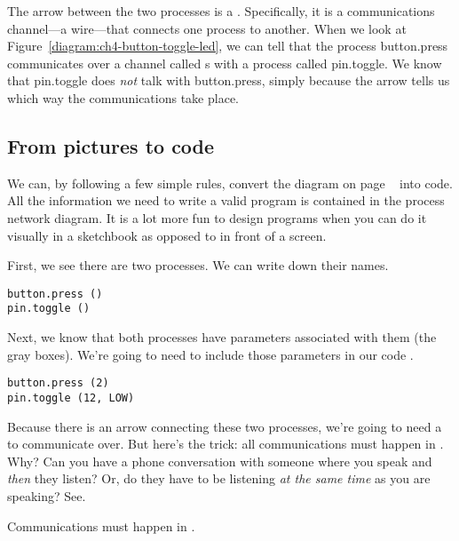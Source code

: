 The arrow between the two processes is a \CHANnel. Specifically, it is a communications channel---a wire---that connects one process to another. When we look at Figure~\vref{diagram:ch4-button-toggle-led}, we can tell that the process {\code button.press} communicates over a channel called {\code s} with a process called {\code pin.toggle}. We know that {\code pin.toggle} does {\em not} talk with {\code button.press}, simply because the arrow tells us which way the communications take place.


\subsection{From pictures to code}
We can, by following a few simple rules, convert the diagram on page ~\pageref{diagram:ch4-button-toggle-led}\xspace into code. {\strong All the information we need to write a valid \occam program is contained in the process network diagram.} It is a lot more fun to design programs  when you can do it visually in a sketchbook as opposed to in front of a screen.

First, we see there are two {\strong processes}. We can write down their names.

\vspace{3mm}
\begin{lstlisting}
button.press ()
pin.toggle ()
\end{lstlisting}

Next, we know that both processes have {\strong parameters} associated with them (the gray boxes). We're going to need to include those parameters in our code%
.

\vspace{3mm}
\begin{lstlisting}
button.press (2)
pin.toggle (12, LOW)
\end{lstlisting}

Because there is an arrow connecting these two processes, we're going to need a \CHANnel to communicate over. But here's the trick: {\strong all communications must happen in \PARallel}. Why? Can you have a phone conversation with someone where you speak and {\em then} they listen? Or, do they have to be listening {\em at the same time} as you are speaking? See. 

{\strong Communications must happen in \PARallel.}

